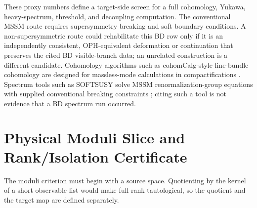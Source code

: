 \documentclass[11pt]{article}
\theoremstyle{remark}
\theoremstyle{plain}
\begin{document}
These proxy numbers define a target-side screen for a full cohomology, Yukawa, heavy-spectrum,
threshold, and decoupling computation. The conventional MSSM route requires supersymmetry
breaking and soft boundary conditions. A non-supersymmetric route could rehabilitate this BD row
only if it is an independently consistent, OPH-equivalent deformation or continuation that
preserves the cited BD visible-branch data; an unrelated construction is a different candidate.
Cohomology algorithms such as
cohomCalg-style line-bundle
cohomology are designed for massless-mode calculations in compactifications
\cite{BlumenhagenJurkeRahnRoschy2010}. Spectrum tools such as SOFTSUSY solve MSSM
renormalization-group equations with supplied conventional breaking constraints
\cite{Allanach2001}; citing such a tool is not evidence that a BD spectrum run occurred.

\section{Physical Moduli Slice and Rank/Isolation Certificate}
\label{sec:bd-rank-certificate}

The moduli criterion must begin with a source space. Quotienting by the kernel of a short observable
list would make full rank tautological, so the quotient and the target map are defined separately.
\end{document}
